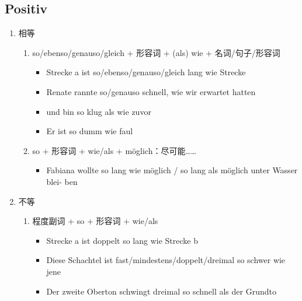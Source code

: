 \documentclass[UTF8]{report}
\begin{document}
\subsection{Positiv}
\begin{enumerate}
    \item 相等
    \begin{enumerate}
        \item so/ebenso/genauso/gleich + 形容词 + (als) wie + 名词/句子/形容词
        \begin{itemize}
            \item Strecke a ist so/ebenso/genauso/gleich lang wie Strecke
            \item Renate rannte so/genauso schnell, wie wir erwartet hatten
            \item und bin so klug als wie zuvor
            \item Er ist so dumm wie faul
        \end{itemize}
        \item so + 形容词 + wie/als + möglich：尽可能……
        \begin{itemize}
            \item Fabiana wollte so lang wie möglich / so lang als möglich unter Wasser blei- ben
        \end{itemize}
    \end{enumerate}
    \item 不等
    \begin{enumerate}
        \item 程度副词 + so + 形容词 + wie/als
        \begin{itemize}
            \item Strecke a ist doppelt so lang wie Strecke b
            \item Diese Schachtel ist fast/mindestens/doppelt/dreimal so schwer wie jene
            \item Der zweite Oberton schwingt dreimal so schnell als der Grundto
        \end{itemize}
    \end{enumerate}
\end{enumerate}
\end{document}
